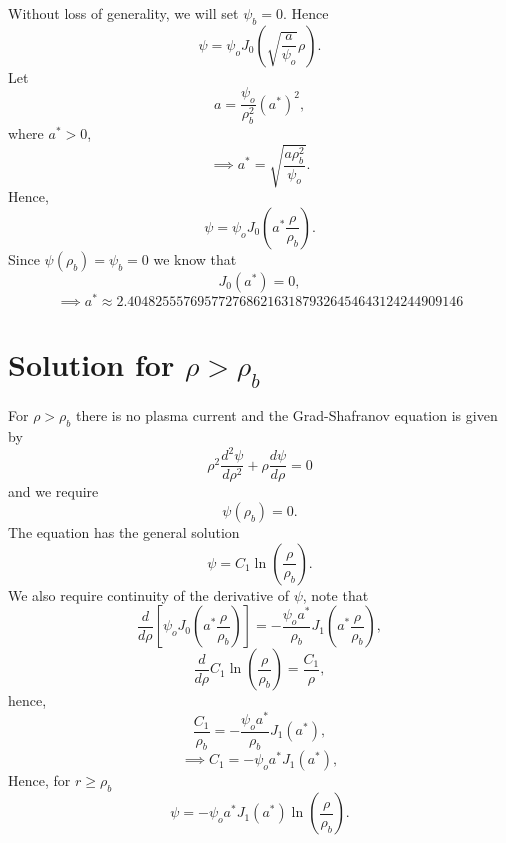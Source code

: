 \documentclass{article}
\begin{document}
Without loss of generality, we will set $\psi_b=0$. Hence
\[\psi = \psi_oJ_0\left(\sqrt{\frac{a}{\psi_o}}\rho\right).\]
Let
\[a = \frac{\psi_o}{\rho_b^2}(a^*)^2,\]
where $a^*>0$,
\[\implies a^* = \sqrt{\frac{a\rho_b^2}{\psi_o}}.\]
Hence,
\[\psi = \psi_oJ_0\left(a^*\frac{\rho}{\rho_b}\right).\]
Since $\psi(\rho_b)=\psi_b=0$ we know that
\[J_0(a^*)=0,\]
\[\implies a^* \approx 2.404825557695772768621631879326454643124244909146\]

\section{Solution for $\rho>\rho_b$}

For $\rho>\rho_b$ there is no plasma current and the Grad-Shafranov equation is given by
\[\rho^2\frac{d^2\psi}{d \rho^2} + \rho\frac{d \psi}{d \rho} = 0\]
and we require
\[\psi(\rho_b)=0.\]
The equation has the general solution
\[\psi = C_1\ln\left(\frac{\rho}{\rho_b}\right).\]
We also require continuity of the derivative of $\psi$, note that
\[\frac{d}{d\rho}\left[\psi_oJ_0\left(a^*\frac{\rho}{\rho_b}\right)\right]=-\frac{\psi_oa^*}{\rho_b}J_1\left(a^*\frac{\rho}{\rho_b}\right),\]
\[\frac{d}{d\rho} C_1\ln\left(\frac{\rho}{\rho_b}\right) = \frac{C_1}{\rho},\]
hence,
\[\frac{C_1}{\rho_b} = -\frac{\psi_oa^*}{\rho_b}J_1(a^*),\]
\[\implies C_1 = -\psi_oa^*J_1(a^*),\]
Hence, for $r\ge\rho_b$
\[\psi = -\psi_oa^*J_1(a^*)\ln\left(\frac{\rho}{\rho_b}\right).\]



\end{document}
